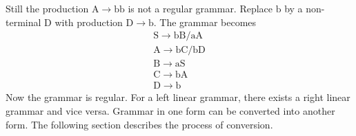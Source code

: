 \documentclass [12pt]{beamer}
\begin{document}
\begin{frame}
Still the production $\mathrm{A} \rightarrow \mathrm{bb}$ is not a regular grammar. Replace $\mathrm{b}$ by a non-terminal $\mathrm{D}$ with production $\mathrm{D} \rightarrow \mathrm{b}$. The grammar becomes
$$
\begin{array}{l}
	\mathrm{S} \rightarrow \mathrm{bB} / \mathrm{aA} \\
	\mathrm{A} \rightarrow \mathrm{bC} / \mathrm{bD} \\
	\mathrm{B} \rightarrow \mathrm{aS} \\
	\mathrm{C} \rightarrow \mathrm{bA} \\
	\mathrm{D} \rightarrow \mathrm{b}
\end{array}
$$
Now the grammar is regular. For a left linear grammar, there exists a right linear grammar and vice versa. Grammar in one form can be converted into another form. The following section describes the process of conversion.

\end{frame}
\end{document}
